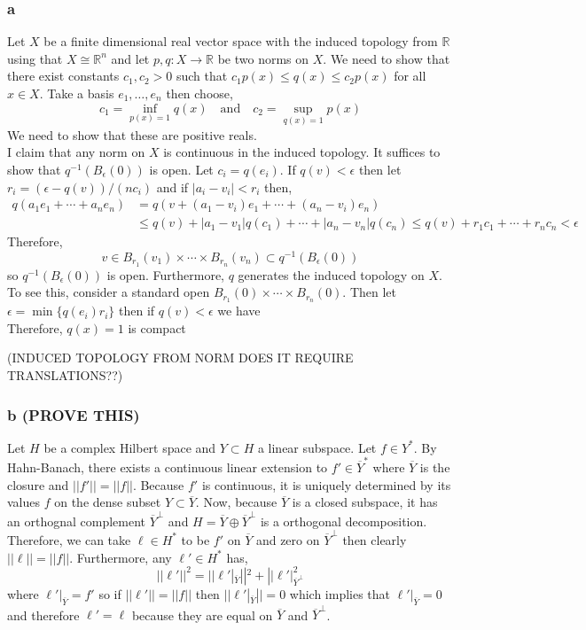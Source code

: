 \documentclass[12pt]{article}
\newcommand{\R}{\mathbb{R}}
\begin{document}
\subsubsection{a}

Let $X$ be a finite dimensional real vector space with the induced topology from $\R$ using that $X \cong \R^n$ and let $p, q : X \to \R$ be two norms on $X$. We need to show that there exist constants $c_1, c_2 > 0$ such that $c_1 p(x) \le q(x) \le c_2 p(x)$ for all $x \in X$. Take a basis $e_1, \dots, e_n$ then choose,
\[ c_1 = \inf_{p(x) = 1} q(x) \quad \text{and} \quad c_2 = \sup_{q(x) = 1} p(x) \]
We need to show that these are positive reals.
\bigskip\\
I claim that any norm on $X$ is continuous in the induced topology. It suffices to show that $q^{-1}(B_\epsilon(0))$ is open. Let $c_i = q(e_i)$. If $q(v) < \epsilon$ then let $r_i = (\epsilon - q(v))/(n c_i)$ and if $|a_i - v_i| < r_i$ then,
\begin{align*}
q(a_1 e_1 + \cdots + a_n e_n) & = q(v + (a_1 - v_i) e_1 + \cdots + (a_n - v_i) e_n) 
\\
& \le q(v) + | a_1 - v_1| q(c_1) + \cdots + |a_n - v_n| q(c_n) \le q(v) + r_1 c_1 + \cdots + r_n c_n < \epsilon
\end{align*}
Therefore, 
\[ v \in B_{r_1}(v_1) \times \cdots \times B_{r_n}(v_n) \subset q^{-1}(B_\epsilon(0)) \]
so $q^{-1}(B_\epsilon(0))$ is open. Furthermore, $q$ generates the induced topology on $X$. To see this, consider a standard open $B_{r_1}(0) \times \cdots \times B_{r_n}(0)$. Then let $\epsilon = \min\{ q(e_i) r_i \}$ then if $q(v) < \epsilon$ we have
\bigskip\\
Therefore, $q(x) = 1$ is compact 

(INDUCED TOPOLOGY FROM NORM DOES IT REQUIRE TRANSLATIONS??)

\subsubsection{b (PROVE THIS)}

Let $H$ be a complex Hilbert space and $Y \subset H$ a linear subspace. Let $f \in Y^*$. By Hahn-Banach, there exists a continuous linear extension to $f' \in \overline{Y}^*$ where $\overline{Y}$ is the closure and $|| f' || = || f ||$. Because $f'$ is continuous, it is uniquely determined by its values $f$ on the dense subset $Y \subset \overline{Y}$. Now, because $\overline{Y}$ is a closed subspace, it has an orthognal complement $\overline{Y}^\perp$ and $H = \overline{Y} \oplus \overline{Y}^\perp$ is a orthogonal decomposition. Therefore, we can take $\ell \in H^*$ to be $f'$ on $\overline{Y}$ and zero on $\overline{Y}^\perp$ then clearly $|| \ell || = || f ||$. Furthermore, any $\ell' \in H^*$ has,
\[ || \ell' ||^2 = || \ell'|_{\overline{Y}} ||^2 + || \ell'|_{\overline{Y}^\perp}^2 \]
where $\ell'|_{\overline{Y}} = f'$ so if $|| \ell' || = || f ||$ then $|| \ell'|_{\overline{Y}} || = 0$ which implies that $\ell' |_{\overline{Y}} = 0$ and therefore $\ell' = \ell$ because they are equal on $\overline{Y}$ and $\overline{Y}^\perp$.
\end{document}
